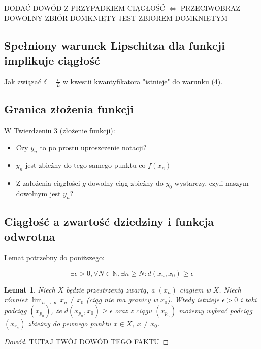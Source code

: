 \documentclass{article}
\newtheorem{lemma}{Lemat}
\begin{document}
\begin{center}
    DODAĆ DOWÓD Z PRZYPADKIEM CIĄGŁOŚĆ \(\iff\) PRZECIWOBRAZ DOWOLNY ZBIÓR DOMKNIĘTY JEST ZBIOREM DOMKNIĘTYM
\end{center}

\subsection{Spełniony warunek Lipschitza dla funkcji implikuje ciągłość}

Jak związać \(\delta = \frac{\epsilon}{L}\) w kwestii kwantyfikatora "istnieje" do warunku (4).

\subsection{Granica złożenia funkcji}

W Twierdzeniu 3 (złożenie funkcji):

\begin{itemize}
    \item Czy \(y_n\) to po prostu uproszczenie notacji?
    \item \(y_n\) jest zbieżny do tego samego punktu co \(f(x_n)\)
    \item Z założenia ciągłości \(g\) dowolny ciąg zbieżny do \(y_0\) wystarczy, czyli naszym dowolnym jest \(y_n\)?
\end{itemize}

\subsection{Ciągłość a zwartość dziedziny i funkcja odwrotna}

Lemat potrzebny do poniższego:

\begin{equation*}
    \exists \epsilon > 0, \forall N \in \mathbb{N}, \exists n \geq N: d(x_n, x_0) \geq \epsilon
\end{equation*}

\begin{lemma}
    Niech \(X\) będzie przestrzenią zwartą, a \((x_n)\) ciągiem w \(X\).
    Niech również \(\lim_{n \to \infty} x_n \neq x_0\) (ciąg nie ma granicy w \(x_0\)).
    Wtedy istnieje \(\epsilon > 0\) i taki podciąg \((x_{p_n})\), że \(d(x_{p_n}, x_0) \geq \epsilon\) oraz
    z ciągu \((x_{p_n})\) możemy wybrać podciąg \((x_{r_n})\)
    zbieżny do pewnego punktu \(\overline{x} \in X\), \(\overline{x} \neq x_0\).
\end{lemma}
\begin{proof}[Dowód]
    TUTAJ TWÓJ DOWÓD TEGO FAKTU
\end{proof}
\end{document}
